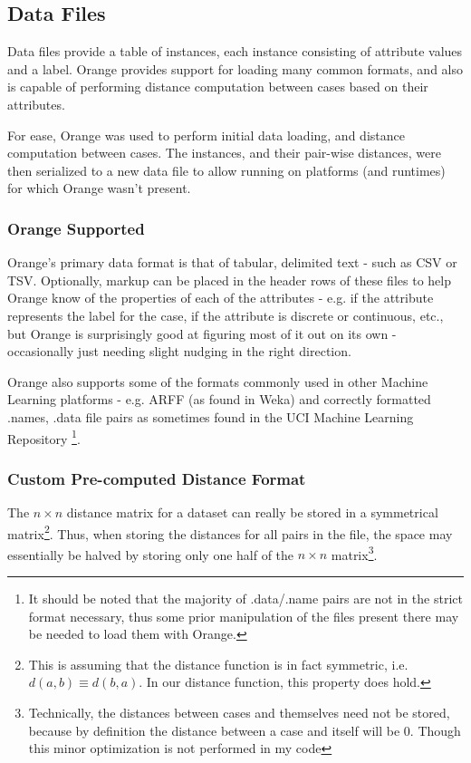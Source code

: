 \documentclass[a4paper,11pt]{report}
\begin{document}
\subsection{Data Files}
Data files provide a table of instances, each instance consisting of attribute values and a label. Orange provides support for loading many common formats, and also is capable of performing distance computation between cases based on their attributes.

For ease, Orange was used to perform initial data loading, and distance computation between cases. The instances, and their pair-wise distances, were then serialized to a new data file to allow running on platforms (and runtimes) for which Orange wasn't present.

\subsubsection{Orange Supported}
Orange's primary data format is that of tabular, delimited text - such as CSV or TSV. Optionally, markup can be placed in the header rows of these files to help Orange know of the properties of each of the attributes - e.g. if the attribute represents the label for the case, if the attribute is discrete or continuous, etc., but Orange is surprisingly good at figuring most of it out on its own - occasionally just needing slight nudging in the right direction.

Orange also supports some of the formats commonly used in other Machine Learning platforms - e.g. ARFF (as found in Weka) and correctly formatted .names, .data file pairs as sometimes found in the UCI Machine Learning Repository \citep{web:uci}\footnote{It should be noted that the majority of .data/.name pairs are not in the strict format necessary, thus some prior manipulation of the files present there may be needed to load them with Orange.}.

\subsubsection{Custom Pre-computed Distance Format}

The $n \times n$ distance matrix for a dataset can really be stored in a symmetrical matrix\footnote{This is assuming that the distance function is in fact symmetric, i.e. $d(a, b)\equiv d(b, a)$. In our distance function, this property does hold.}. Thus, when storing the distances for all pairs in the file, the space may essentially be halved by storing only one half of the $n \times n$ matrix\footnote{Technically, the distances between cases and themselves need not be stored, because by definition the distance between a case and itself will be 0. Though this minor optimization is not performed in my code}.
\end{document}
